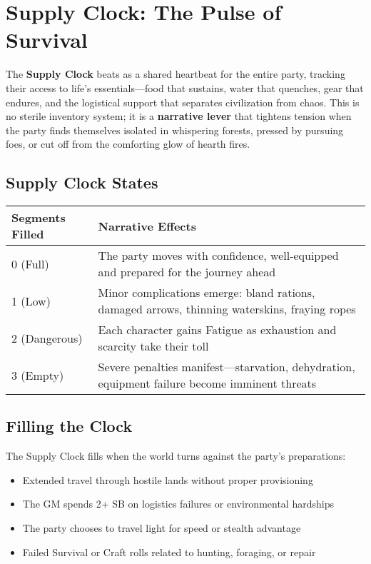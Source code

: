 \section*{Supply Clock: The Pulse of Survival}

The \textbf{Supply Clock} beats as a shared heartbeat for the entire party, tracking their access to life's essentials---food that sustains, water that quenches, gear that endures, and the logistical support that separates civilization from chaos. This is no sterile inventory system; it is a \textbf{narrative lever} that tightens tension when the party finds themselves isolated in whispering forests, pressed by pursuing foes, or cut off from the comforting glow of hearth fires.

\subsection*{Supply Clock States}

\begin{fatebox}
\begin{tabularx}{\textwidth}{lX}
\toprule
\textbf{Segments Filled} & \textbf{Narrative Effects} \\
\midrule
0 (Full) & The party moves with confidence, well-equipped and prepared for the journey ahead \\
1 (Low) & Minor complications emerge: bland rations, damaged arrows, thinning waterskins, fraying ropes \\
2 (Dangerous) & Each character gains Fatigue as exhaustion and scarcity take their toll \\
3 (Empty) & Severe penalties manifest—starvation, dehydration, equipment failure become imminent threats \\
\bottomrule
\end{tabularx}
\end{fatebox}

\subsection*{Filling the Clock}

The Supply Clock fills when the world turns against the party's preparations:

\begin{itemize}
    \item Extended travel through hostile lands without proper provisioning
    \item The GM spends 2+ SB on logistics failures or environmental hardships
    \item The party chooses to travel light for speed or stealth advantage
    \item Failed Survival or Craft rolls related to hunting, foraging, or repair
\end{itemize}

